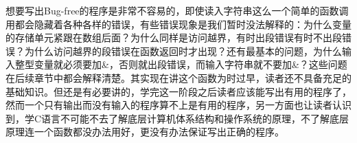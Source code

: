 想要写出Bug-free的程序是非常不容易的，即使读入字符串这么一个简单的函数调用都会隐藏着各种各样的错误，有些错误现象是我们暂时没法解释的：为什么变量的存储单元紧跟在数组后面？为什么同样是访问越界，有时出段错误有时不出段错误？为什么访问越界的段错误在函数返回时才出现？还有最基本的问题，为什么输入整型变量就必须要加\&，否则就出段错误，而输入字符串就不要加\&？这些问题在后续章节中都会解释清楚。其实现在讲这个函数为时过早，读者还不具备充足的基础知识。但还是有必要讲的，学完这一阶段之后读者应该能写出有用的程序了，然而一个只有输出而没有输入的程序算不上是有用的程序，另一方面也让读者认识到，学C语言不可能不去了解底层计算机体系结构和操作系统的原理，不了解底层原理连一个函数都没办法用好，更没有办法保证写出正确的程序。

